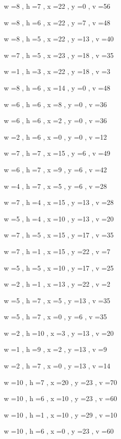 \documentclass[11pt]{article}
\begin{document}
w =8 , h =7 , x =22 , y =0 , v =56
\par
w =8 , h =6 , x =22 , y =7 , v =48
\par
w =8 , h =5 , x =22 , y =13 , v =40
\par
w =7 , h =5 , x =23 , y =18 , v =35
\par
w =1 , h =3 , x =22 , y =18 , v =3
\par
w =8 , h =6 , x =14 , y =0 , v =48
\par
w =6 , h =6 , x =8 , y =0 , v =36
\par
w =6 , h =6 , x =2 , y =0 , v =36
\par
w =2 , h =6 , x =0 , y =0 , v =12
\par
w =7 , h =7 , x =15 , y =6 , v =49
\par
w =6 , h =7 , x =9 , y =6 , v =42
\par
w =4 , h =7 , x =5 , y =6 , v =28
\par
w =7 , h =4 , x =15 , y =13 , v =28
\par
w =5 , h =4 , x =10 , y =13 , v =20
\par
w =7 , h =5 , x =15 , y =17 , v =35
\par
w =7 , h =1 , x =15 , y =22 , v =7
\par
w =5 , h =5 , x =10 , y =17 , v =25
\par
w =2 , h =1 , x =13 , y =22 , v =2
\par
w =5 , h =7 , x =5 , y =13 , v =35
\par
w =5 , h =7 , x =0 , y =6 , v =35
\par
w =2 , h =10 , x =3 , y =13 , v =20
\par
w =1 , h =9 , x =2 , y =13 , v =9
\par
w =2 , h =7 , x =0 , y =13 , v =14
\par
w =10 , h =7 , x =20 , y =23 , v =70
\par
w =10 , h =6 , x =10 , y =23 , v =60
\par
w =10 , h =1 , x =10 , y =29 , v =10
\par
w =10 , h =6 , x =0 , y =23 , v =60
\par
\newpage


\end{document}
